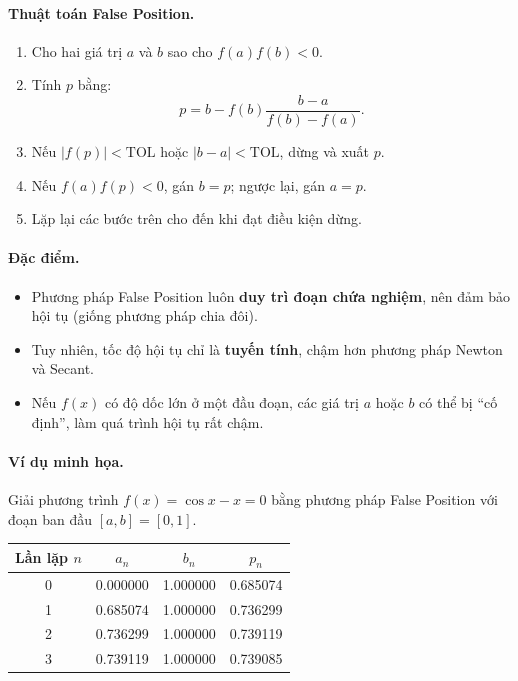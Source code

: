 \paragraph*{Thuật toán False Position.}
\begin{enumerate}
    \item Cho hai giá trị $a$ và $b$ sao cho $f(a)f(b) < 0$.
    \item Tính $p$ bằng:
    \[
        p = b - f(b)\frac{b - a}{f(b) - f(a)}.
    \]
    \item Nếu $|f(p)| < \text{TOL}$ hoặc $|b - a| < \text{TOL}$, dừng và xuất $p$.
    \item Nếu $f(a)f(p) < 0$, gán $b = p$; ngược lại, gán $a = p$.
    \item Lặp lại các bước trên cho đến khi đạt điều kiện dừng.
\end{enumerate}

\paragraph*{Đặc điểm.}
\begin{itemize}
    \item Phương pháp False Position luôn \textbf{duy trì đoạn chứa nghiệm}, 
    nên đảm bảo hội tụ (giống phương pháp chia đôi).
    \item Tuy nhiên, tốc độ hội tụ chỉ là \textbf{tuyến tính}, 
    chậm hơn phương pháp Newton và Secant.
    \item Nếu $f(x)$ có độ dốc lớn ở một đầu đoạn, các giá trị $a$ hoặc $b$ có thể bị “cố định”, 
    làm quá trình hội tụ rất chậm.
\end{itemize}

\paragraph*{Ví dụ minh họa.}
Giải phương trình $f(x) = \cos x - x = 0$ bằng phương pháp False Position 
với đoạn ban đầu $[a, b] = [0, 1]$.

\begin{center}
\begin{tabular}{|c|c|c|c|}
\hline
\textbf{Lần lặp} $n$ & $a_n$ & $b_n$ & $p_n$ \\
\hline
0 & 0.000000 & 1.000000 & 0.685074 \\
1 & 0.685074 & 1.000000 & 0.736299 \\
2 & 0.736299 & 1.000000 & 0.739119 \\
3 & 0.739119 & 1.000000 & 0.739085 \\
\hline
\end{tabular}
\end{center}

